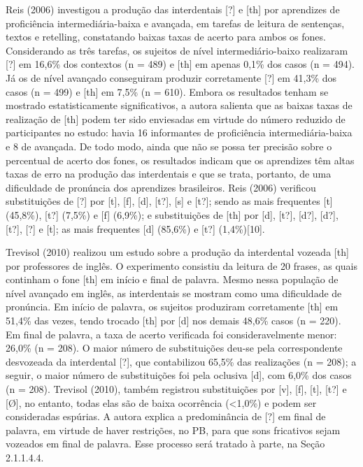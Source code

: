 Reis (2006) investigou a produ\c{c}\~ao das interdentais {[}?{]} e {[}th{]} por
aprendizes de profici\^encia intermedi\'aria-baixa e avan\c{c}ada, em tarefas de
leitura de senten\c{c}as, textos e retelling, constatando baixas taxas de
acerto para ambos os fones. Considerando as tr\^es tarefas, os sujeitos de
n\'ivel intermedi\'ario-baixo realizaram {[}?{]} em 16,6\% dos contextos (n
= 489) e {[}th{]} em apenas 0,1\% dos casos (n = 494). J\'a os de n\'ivel
avan\c{c}ado conseguiram produzir corretamente {[}?{]} em 41,3\% dos casos
(n = 499) e {[}th{]} em 7,5\% (n = 610). Embora os resultados tenham se
mostrado estatisticamente significativos, a autora salienta que as
baixas taxas de realiza\c{c}\~ao de {[}th{]} podem ter sido enviesadas em
virtude do n\'umero reduzido de participantes no estudo: havia 16
informantes de profici\^encia intermedi\'aria-baixa e 8 de avan\c{c}ada. De todo
modo, ainda que n\~ao se possa ter precis\~ao sobre o percentual de acerto
dos fones, os resultados indicam que os aprendizes t\^em altas taxas de
erro na produ\c{c}\~ao das interdentais e que se trata, portanto, de uma
dificuldade de pron\'uncia dos aprendizes brasileiros. Reis (2006)
verificou substitui\c{c}\~oes de {[}?{]} por {[}t{]}, {[}f{]}, {[}d{]},
{[}t?{]}, {[}s{]} e {[}t?{]}; sendo as mais frequentes {[}t{]} (45,8\%),
{[}t?{]} (7,5\%) e {[}f{]} (6,9\%); e substitui\c{c}\~oes de {[}th{]} por
{[}d{]}, {[}t?{]}, {[}d?{]}, {[}d?{]}, {[}t?{]}, {[}?{]} e {[}t{]}; as
mais frequentes {[}d{]} (85,6\%) e {[}t?{]} (1,4\%){[}10{]}.

Trevisol (2010) realizou um estudo sobre a produ\c{c}\~ao da interdental
vozeada {[}th{]} por professores de ingl\^es. O experimento consistiu da
leitura de 20 frases, as quais continham o fone {[}th{]} em in\'icio e
final de palavra. Mesmo nessa popula\c{c}\~ao de n\'ivel avan\c{c}ado em ingl\^es, as
interdentais se mostram como uma dificuldade de pron\'uncia. Em in\'icio de
palavra, os sujeitos produziram corretamente {[}th{]} em 51,4\% das
vezes, tendo trocado {[}th{]} por {[}d{]} nos demais 48,6\% casos (n =
220). Em final de palavra, a taxa de acerto verificada foi
consideravelmente menor: 26,0\% (n = 208). O maior n\'umero de
substitui\c{c}\~oes deu-se pela correspondente desvozeada da interdental
{[}?{]}, que contabilizou 65,5\% das realiza\c{c}\~oes (n = 208); a seguir, o
maior n\'umero de substitui\c{c}\~oes foi pela oclusiva {[}d{]}, com 6,0\% dos
casos (n = 208). Trevisol (2010), tamb\'em registrou substitui\c{c}\~oes por
{[}v{]}, {[}f{]}, {[}t{]}, {[}t?{]} e {[}Ø{]}, no entanto, todas elas
s\~ao de baixa ocorr\^encia (\textless{}1,0\%) e podem ser consideradas
esp\'urias. A autora explica a predomin\^ancia de {[}?{]} em final de
palavra, em virtude de haver restri\c{c}\~oes, no PB, para que sons fricativos
sejam vozeados em final de palavra. Esse processo ser\'a tratado à parte,
na Se\c{c}\~ao 2.1.1.4.4.

